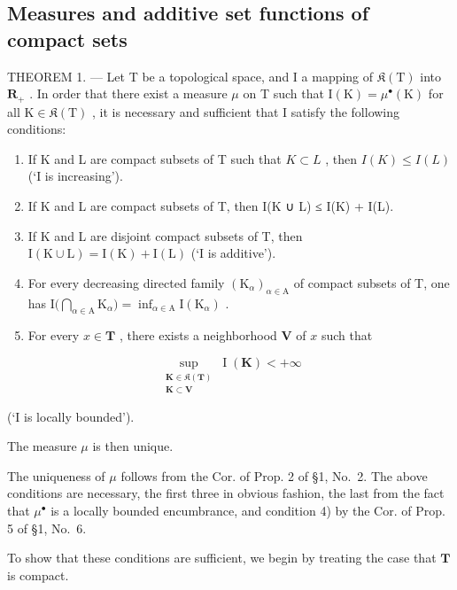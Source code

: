 \subsection{Measures and additive set functions of compact sets}

THEOREM 1. --- Let T be a topological space, and I a mapping of \(\mathfrak{K}(\mathrm{T})\) into \(\mathbf{R}_{+}\) . In order that there exist a measure \(\mu\) on T such that \(\mathrm{I}(\mathrm{K}) = \mu^{\bullet}(\mathrm{K})\) for all \(\mathrm{K} \in \mathfrak{K}(\mathrm{T})\) , it is necessary and sufficient that I satisfy the following conditions:

\begin{enumerate}
\def\labelenumi{\arabic{enumi})}
\item
  If K and L are compact subsets of T such that \(K \subset L\) , then \(I(K) \leqslant I(L)\) (`I is increasing').
\item
  If K and L are compact subsets of T, then I(K ∪ L) ≤ I(K) + I(L).
\item
  If K and L are disjoint compact subsets of T, then \(\mathrm{I}(\mathrm{K}\cup\mathrm{L})=\mathrm{I}(\mathrm{K})+\mathrm{I}(\mathrm{L})\) (`I is additive').
\item
  For every decreasing directed family \((\mathrm{K}_{\alpha})_{\alpha \in \mathrm{A}}\) of compact subsets of T, one has \(\mathrm{I}\big(\bigcap_{\alpha \in \mathrm{A}}\mathrm{K}_{\alpha}\big) = \inf_{\alpha \in \mathrm{A}}\mathrm{I}(\mathrm{K}_{\alpha})\) .
\item
  For every \(x \in \mathbf{T}\) , there exists a neighborhood \(\mathbf{V}\) of \(x\) such that
\end{enumerate}

\[
\sup_{\substack{\mathbf{K}\in \mathfrak{K}(\mathbf{T})\\ \mathbf{K}\subset \mathbf{V}}}\operatorname{I}(\mathbf{K}) <   + \infty
\]

(`I is locally bounded').

The measure \(\mu\) is then unique.

The uniqueness of \(\mu\) follows from the Cor. of Prop. 2 of §1, No.~2. The above conditions are necessary, the first three in obvious fashion, the last from the fact that \(\mu^{\bullet}\) is a locally bounded encumbrance, and condition 4) by the Cor. of Prop. 5 of §1, No.~6.

To show that these conditions are sufficient, we begin by treating the case that \(\mathbf{T}\) is compact.

